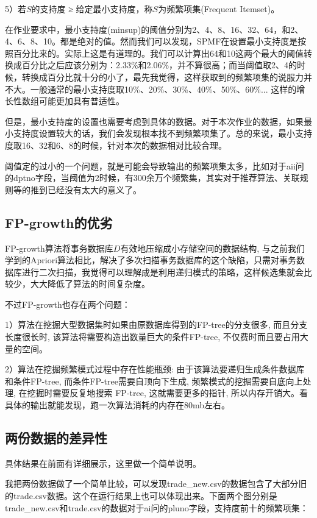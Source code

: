 \documentclass{article}
\begin{document}
\begin{CJK}{UTF8}{gbsn}
5）若$S$的支持度 ≥ 给定最小支持度，称$S$为频繁项集(Frequent Itemset)。

在作业要求中，最小支持度(minsup)的阈值分别为2、4、8、16、32、64，和2、4、6、8、10。都是绝对的值。然而我们可以发现，SPMF在设置最小支持度是按照百分比来的。实际上这是有道理的。我们可以计算出64和10这两个最大的阈值转换成百分比之后应该分别为：2.33\%和2.06\%，并不算很高；而当阈值取2、4的时候，转换成百分比就十分的小了，最先我觉得，这样获取到的频繁项集的说服力并不大。一般通常的最小支持度取10\%、20\%、30\%、40\%、50\%、60\%... 这样的增长性数组可能更加具有普适性。

但是，最小支持度的设置也需要考虑到具体的数据。对于本次作业的数据，如果最小支持度设置较大的话，我们会发现根本找不到频繁项集了。总的来说，最小支持度取16、32和6、8的时候，针对本次的数据相对比较合理。

阈值定的过小的一个问题，就是可能会导致输出的频繁项集太多，比如对于aii问的dptno字段，当阈值为2时候，有300余万个频繁集，其实对于推荐算法、关联规则等的推到已经没有太大的意义了。

\subsection{FP-growth的优劣}
FP-growth算法将事务数据库$D$有效地压缩成小存储空间的数据结构, 与之前我们学到的Apriori算法相比，解决了多次扫描事务数据库的这个缺陷，只需对事务数据库进行二次扫描，我觉得可以理解成是利用递归模式的策略，这样候选集就会比较少，大大降低了算法的时间复杂度。

不过FP-growth也存在两个问题：

1）算法在挖掘大型数据集时如果由原数据库得到的FP-tree的分支很多, 而且分支长度很长时, 该算法将需要构造出数量巨大的条件FP-tree, 不仅费时而且要占用大量的空间。

2）算法在挖掘频繁模式过程中存在性能瓶颈: 由于该算法要递归生成条件数据库和条件FP-tree, 而条件FP-tree需要自顶向下生成, 频繁模式的挖掘需要自底向上处理, 在挖掘时需要反复地搜索 FP-tree, 这就需要更多的指针, 所以内存开销大。看具体的输出就能发现，跑一次算法消耗的内存在80mb左右。

\subsection{两份数据的差异性}
具体结果在前面有详细展示，这里做一个简单说明。

我把两份数据做了一个简单比较，可以发现trade\_new.csv的数据包含了大部分旧的trade.csv数据。这个在运行结果上也可以体现出来。下面两个图分别是trade\_new.csv和trade.csv的数据对于ai问的pluno字段，支持度前十的频繁项集：


\end{CJK}
\end{document}
